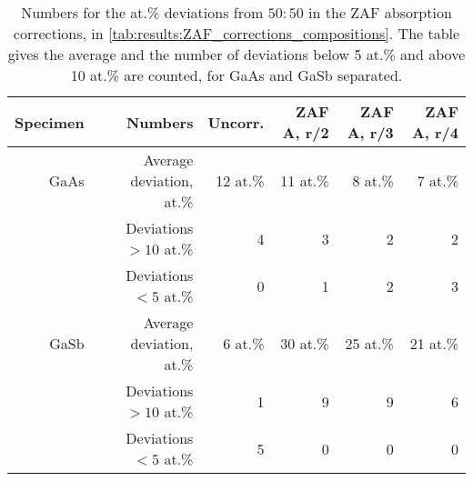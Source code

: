 \begin{table}[phtb]
    \begin{center}
        \caption{
            Numbers for the at.\% deviations from $50:50$ in the ZAF absorption corrections, in \cref{tab:results:ZAF_corrections_compositions}.
            The table gives the average and the number of deviations below 5 at.\% and above 10 at.\% are counted, for GaAs and GaSb separated.
        }
        \label{tab:results:ZAF_corrections_compositions_stats}
        \begin{tabular}{rrrrrr}
            \hline
            \textbf{Specimen} & \textbf{Numbers}         & \textbf{Uncorr.} & \textbf{ZAF A, r/2} & \textbf{ZAF A, r/3} & \textbf{ZAF A, r/4} \\
            \hline

            GaAs              & Average deviation, at.\% & 12 at.\%         & 11 at.\%            & 8 at.\%             & 7 at.\%             \\
                              & Deviations $>10$ at.\%   & 4                & 3                   & 2                   & 2                   \\
                              & Deviations  $<5$  at.\%  & 0                & 1                   & 2                   & 3                   \\
            \hline
            GaSb              & Average deviation, at.\% & 6 at.\%          & 30 at.\%            & 25 at.\%            & 21 at.\%            \\
                              & Deviations $>10$ at.\%   & 1                & 9                   & 9                   & 6                   \\
                              & Deviations  $<5$  at.\%  & 5                & 0                   & 0                   & 0                   \\

            \hline
        \end{tabular}
    \end{center}
\end{table}
